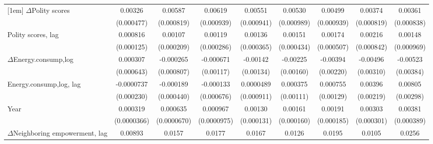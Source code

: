 \begin{table}[htbp]
\begin{tabular}{l*{8}{c}}
[1em]
$\Delta$Polity scores            &     0.00326\sym{***}&     0.00587\sym{***}&     0.00619\sym{***}&     0.00551\sym{***}&     0.00530\sym{***}&     0.00499\sym{***}&     0.00374\sym{***}&     0.00361\sym{***}\\
                    &  (0.000477)         &  (0.000819)         &  (0.000939)         &  (0.000941)         &  (0.000989)         &  (0.000939)         &  (0.000819)         &  (0.000838)         \\
[1em]
Polity scores, lag           &    0.000816\sym{***}&     0.00107\sym{***}&     0.00119\sym{***}&     0.00136\sym{***}&     0.00151\sym{***}&     0.00174\sym{***}&     0.00216\sym{**} &     0.00148         \\
                    &  (0.000125)         &  (0.000209)         &  (0.000286)         &  (0.000365)         &  (0.000434)         &  (0.000507)         &  (0.000842)         &  (0.000969)         \\
[1em]
$\Delta$Energy.consump,log            &    0.000307         &   -0.000265         &   -0.000671         &    -0.00142         &    -0.00225         &    -0.00394\sym{*}  &    -0.00496         &    -0.00523         \\
                    &  (0.000643)         &  (0.000807)         &   (0.00117)         &   (0.00134)         &   (0.00160)         &   (0.00220)         &   (0.00310)         &   (0.00384)         \\
[1em]
Energy.consump,log, lag            &  -0.0000737         &   -0.000189         &   -0.000133         &   0.0000489         &    0.000375         &    0.000755         &     0.00396\sym{*}  &     0.00805\sym{***}\\
                    &  (0.000230)         &  (0.000440)         &  (0.000676)         &  (0.000911)         &   (0.00111)         &   (0.00129)         &   (0.00219)         &   (0.00298)         \\
[1em]
Year                &    0.000319\sym{***}&    0.000635\sym{***}&    0.000967\sym{***}&     0.00130\sym{***}&     0.00161\sym{***}&     0.00191\sym{***}&     0.00303\sym{***}&     0.00381\sym{***}\\
                    & (0.0000366)         & (0.0000670)         & (0.0000975)         &  (0.000131)         &  (0.000160)         &  (0.000185)         &  (0.000301)         &  (0.000389)         \\
[1em]
$\Delta$Neighboring  empowerment, lag&     0.00893\sym{**} &      0.0157\sym{***}&      0.0177\sym{**} &      0.0167\sym{**} &      0.0126         &      0.0195\sym{*}  &      0.0105         &      0.0256\sym{*}  \\

\end{tabular}
\end{table}
